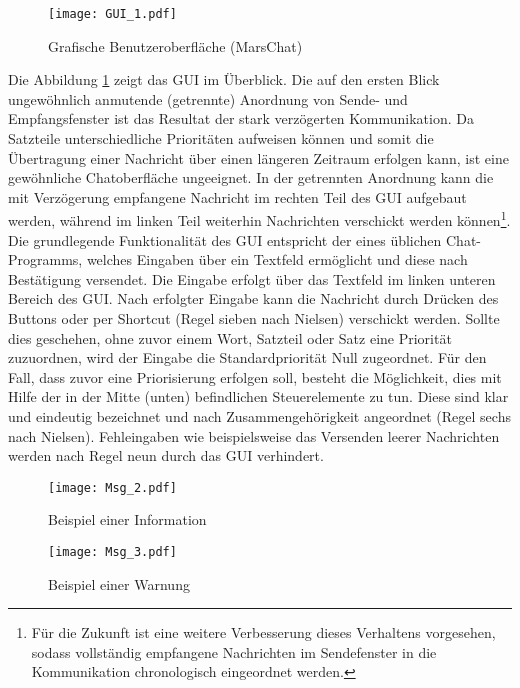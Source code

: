 \begin{figure}[H]
	\centering
	\texttt{[image: GUI\_1.pdf]}
	\caption{Grafische Benutzeroberfläche (MarsChat)}
	\label{fig:GUI}
\end{figure}

Die Abbildung \ref{fig:GUI} zeigt das \gls{GUI} im {\"U}berblick. Die auf den
ersten Blick ungew{\"o}hnlich anmutende (getrennte) Anordnung von Sende- und
Empfangsfenster ist das Resultat der stark verz{\"o}gerten Kommunikation. Da
Satzteile unterschiedliche Priorit{\"a}ten aufweisen k{\"o}nnen und somit die
{\"U}bertragung einer Nachricht {\"u}ber einen l{\"a}ngeren Zeitraum erfolgen
kann, ist eine gew{\"o}hnliche Chatoberfl{\"a}che ungeeignet. In der getrennten
Anordnung kann die mit Verz{\"o}gerung empfangene Nachricht im rechten Teil des
\gls{GUI} aufgebaut werden, w{\"a}hrend im linken Teil weiterhin Nachrichten
verschickt werden k{\"o}nnen\footnote{F{\"u}r die Zukunft ist eine weitere Verbesserung dieses
Verhaltens vorgesehen, sodass vollst{\"a}ndig empfangene Nachrichten im
Sendefenster in die Kommunikation chronologisch eingeordnet werden.}. \newline
\newline Die grundlegende Funktionalit{\"a}t des \gls{GUI} entspricht der eines
{\"u}blichen Chat-Programms, welches Eingaben {\"u}ber ein Textfeld erm{\"o}glicht und diese
nach Best{\"a}tigung versendet. Die Eingabe erfolgt {\"u}ber das Textfeld im
linken unteren Bereich des \gls{GUI}. Nach erfolgter Eingabe kann die Nachricht
durch Dr{\"u}cken des Buttons  oder per Shortcut (Regel
sieben nach Nielsen) verschickt werden. \newline
Sollte dies geschehen, ohne zuvor einem Wort, Satzteil oder Satz eine
Priorit{\"a}t zuzuordnen, wird der Eingabe die Standardpriorit{\"a}t Null
zugeordnet. F{\"u}r den Fall, dass zuvor eine Priorisierung erfolgen soll,
besteht die M{\"o}glichkeit, dies mit Hilfe der in der Mitte (unten)
befindlichen Steuerelemente zu tun. Diese sind klar und eindeutig bezeichnet und nach
Zusammengeh{\"o}rigkeit angeordnet (Regel sechs nach Nielsen). Fehleingaben wie
beispielsweise das Versenden leerer Nachrichten werden nach Regel neun durch das
\gls{GUI} verhindert.

\begin{figure}[H]
	\centering
	\texttt{[image: Msg\_2.pdf]}
	\caption{Beispiel einer Information}
	\label{fig:Msg2}
\end{figure}

\begin{figure}[H]
	\centering
	\texttt{[image: Msg\_3.pdf]}
	\caption{Beispiel einer Warnung}
	\label{fig:Msg3}
\end{figure}

